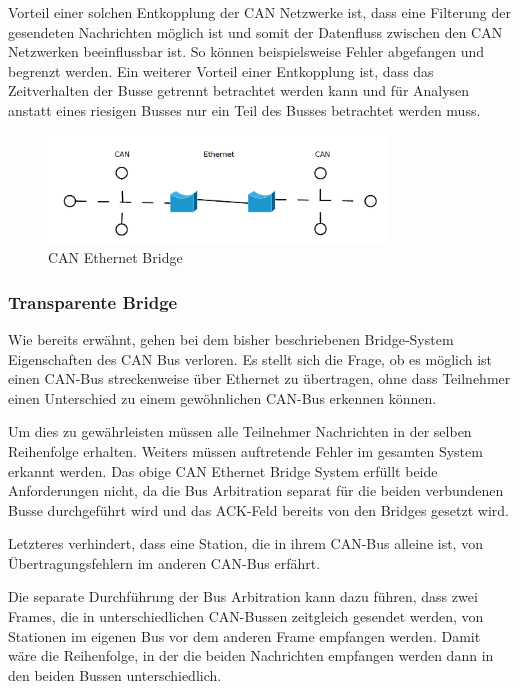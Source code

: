 Vorteil einer solchen Entkopplung der CAN Netzwerke ist, dass eine Filterung der gesendeten 
Nachrichten möglich ist und somit der Datenfluss zwischen den CAN Netzwerken beeinflussbar 
ist. So können beispielsweise Fehler abgefangen und begrenzt werden. Ein weiterer Vorteil 
einer Entkopplung ist, dass das Zeitverhalten der Busse getrennt betrachtet werden kann 
und für Analysen anstatt eines riesigen Busses nur ein Teil des Busses betrachtet werden 
muss.

\begin{figure}[h] 
\centering
\includegraphics[width=0.8\textwidth]{figures/can_bridge}
\caption{CAN Ethernet Bridge} 
\label{bridge}
\end{figure}

\subsubsection{Transparente Bridge}
\label{l:trans}

Wie bereits erwähnt, gehen bei dem bisher beschriebenen Bridge-System Eigenschaften
des CAN Bus verloren. Es stellt sich die Frage, ob es möglich ist einen CAN-Bus
streckenweise über Ethernet zu übertragen, ohne dass Teilnehmer einen Unterschied zu
einem gewöhnlichen CAN-Bus erkennen können.

Um dies zu gewährleisten müssen alle Teilnehmer Nachrichten in der selben Reihenfolge
erhalten. Weiters müssen auftretende Fehler im gesamten System erkannt werden. Das
obige CAN Ethernet Bridge System erfüllt beide Anforderungen nicht, da die Bus
Arbitration separat für die beiden verbundenen Busse durchgeführt wird und das
ACK-Feld bereits von den Bridges gesetzt wird.

Letzteres verhindert, dass eine Station, die in ihrem CAN-Bus alleine ist, von
Übertragungsfehlern im anderen CAN-Bus erfährt.

Die separate Durchführung der Bus Arbitration kann dazu führen, dass zwei Frames, die
in unterschiedlichen CAN-Bussen zeitgleich gesendet werden, von Stationen im eigenen
Bus vor dem anderen Frame empfangen werden. Damit wäre die Reihenfolge, in der die
beiden Nachrichten empfangen werden dann in den beiden Bussen unterschiedlich.

